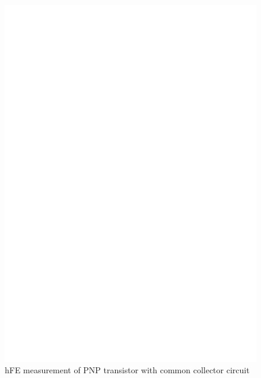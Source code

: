 \begin{figure}[H]
\centering
\includegraphics[]{../FIG/PNPcc.eps}
\caption{hFE measurement of PNP transistor with common collector circuit }
\label{fig:pnpcc}
\end{figure}

